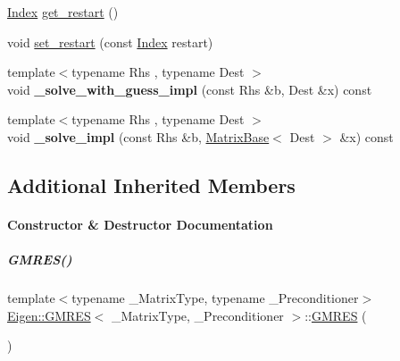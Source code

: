 \begin{DoxyCompactItemize}
\item 
\hyperlink{namespace_eigen_a62e77e0933482dafde8fe197d9a2cfde}{Index} \hyperlink{group___iterative_linear_solvers___module_ade721328e58ace2d4493cbdcbe53ad09}{get\+\_\+restart} ()
\item 
void \hyperlink{group___iterative_linear_solvers___module_ac50d6bbca4a8a275861770feb211900d}{set\+\_\+restart} (const \hyperlink{namespace_eigen_a62e77e0933482dafde8fe197d9a2cfde}{Index} restart)
\item 
\mbox{\label{group___iterative_linear_solvers___module_adc20d4ab02968fbe171dc6d6e82f3b82}} 
{\footnotesize template$<$typename Rhs , typename Dest $>$ }\\void {\bfseries \+\_\+solve\+\_\+with\+\_\+guess\+\_\+impl} (const Rhs \&b, Dest \&x) const
\item 
\mbox{\label{group___iterative_linear_solvers___module_a8064e57ae70670b4023c0d5c7c340049}} 
{\footnotesize template$<$typename Rhs , typename Dest $>$ }\\void {\bfseries \+\_\+solve\+\_\+impl} (const Rhs \&b, \hyperlink{group___core___module_class_eigen_1_1_matrix_base}{Matrix\+Base}$<$ Dest $>$ \&x) const
\end{DoxyCompactItemize}
\subsection*{Additional Inherited Members}


\paragraph{Constructor \& Destructor Documentation}
\mbox{\label{group___iterative_linear_solvers___module_a73153e328dfa402cb3640711289f2985}} 
\subparagraph{\texorpdfstring{G\+M\+R\+E\+S()}{GMRES()}\hspace{0.1cm}{\footnotesize\ttfamily [1/4]}}
{\footnotesize\ttfamily template$<$typename \+\_\+\+Matrix\+Type, typename \+\_\+\+Preconditioner$>$ \\
\hyperlink{group___iterative_linear_solvers___module_class_eigen_1_1_g_m_r_e_s}{Eigen\+::\+G\+M\+R\+ES}$<$ \+\_\+\+Matrix\+Type, \+\_\+\+Preconditioner $>$\+::\hyperlink{group___iterative_linear_solvers___module_class_eigen_1_1_g_m_r_e_s}{G\+M\+R\+ES} (\begin{DoxyParamCaption}{ }\end{DoxyParamCaption})\hspace{0.3cm}{\ttfamily [inline]}}

